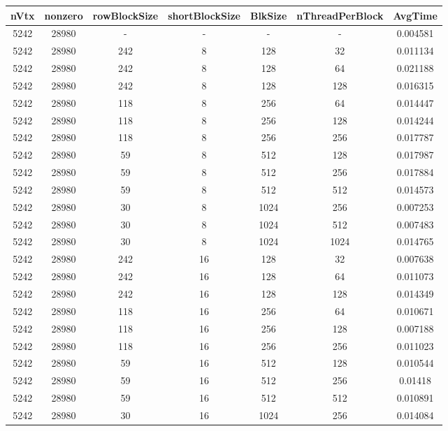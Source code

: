 \documentclass[9pt]{article}
\begin{document}
\SetBgPosition{0.25cm,-5.0cm}
\begin{tabular}{|c|c|c|c|c|c|c| }  
\hline
nVtx  & nonzero  & rowBlockSize  & shortBlockSize  & BlkSize  & nThreadPerBlock  & AvgTime \\
\hline
5242  & 28980  &  -  & -  & -  & -  &0.004581 \\
\hline
5242  & 28980  & 242  & 8  & 128  & 32  & 0.011134 \\
\hline
5242  & 28980  & 242  & 8  & 128  & 64  & 0.021188 \\
\hline
5242  & 28980  & 242  & 8  & 128  & 128  & 0.016315 \\
\hline
5242  & 28980  & 118  & 8  & 256  & 64  & 0.014447 \\
\hline
5242  & 28980  & 118  & 8  & 256  & 128  & 0.014244 \\
\hline
5242  & 28980  & 118  & 8  & 256  & 256  & 0.017787 \\
\hline
5242  & 28980  & 59  & 8  & 512  & 128  & 0.017987 \\
\hline
5242  & 28980  & 59  & 8  & 512  & 256  & 0.017884 \\
\hline
5242  & 28980  & 59  & 8  & 512  & 512  & 0.014573 \\
\hline
5242  & 28980  & 30  & 8  & 1024  & 256  & 0.007253 \\
\hline
5242  & 28980  & 30  & 8  & 1024  & 512  & 0.007483 \\
\hline
5242  & 28980  & 30  & 8  & 1024  & 1024  & 0.014765 \\
\hline
5242  & 28980  & 242  & 16  & 128  & 32  & 0.007638 \\
\hline
5242  & 28980  & 242  & 16  & 128  & 64  & 0.011073 \\
\hline
5242  & 28980  & 242  & 16  & 128  & 128  & 0.014349 \\
\hline
5242  & 28980  & 118  & 16  & 256  & 64  & 0.010671 \\
\hline
5242  & 28980  & 118  & 16  & 256  & 128  & 0.007188 \\
\hline
5242  & 28980  & 118  & 16  & 256  & 256  & 0.011023 \\
\hline
5242  & 28980  & 59  & 16  & 512  & 128  & 0.010544 \\
\hline
5242  & 28980  & 59  & 16  & 512  & 256  & 0.01418 \\
\hline
5242  & 28980  & 59  & 16  & 512  & 512  & 0.010891 \\
\hline
5242  & 28980  & 30  & 16  & 1024  & 256  & 0.014084 \\

\end{tabular}
\end{document}
